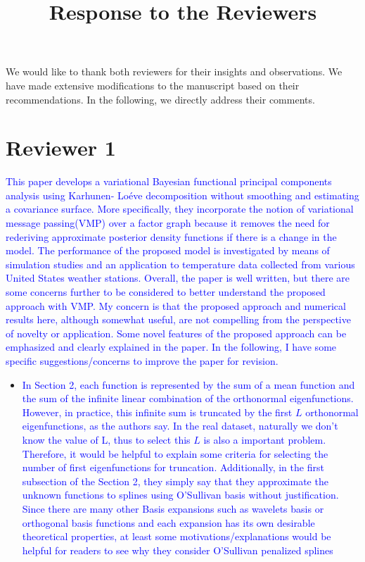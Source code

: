 \documentclass[12pt]{article}
\title{Response to the Reviewers}
\date{}
\author{}
\theoremstyle{plain}
\theoremstyle{definition}
\theoremstyle{remark}
\begin{document}
\maketitle

We would like to thank both reviewers for their insights and observations. We have made extensive modifications
to the manuscript based on their recommendations. In the following, we directly address their comments.


\section*{Reviewer 1}

\textcolor{blue}{
	This paper develops a variational Bayesian functional principal components analysis using
	Karhunen- Lo\'{e}ve decomposition without smoothing and estimating a covariance surface. More specifically,
	they incorporate the notion of variational message passing(VMP) over a factor graph because it removes the
	need for rederiving approximate posterior density functions if there is a change in the model. The performance
	of the proposed model is investigated by means of simulation studies and an application to temperature data
	collected from various United States weather stations. Overall, the paper is well written, but there are some
	concerns further to be considered to better understand the proposed approach with VMP. My concern is that
	the proposed approach and numerical results here, although somewhat useful, are not compelling from the
	perspective of novelty or application. Some novel features of the proposed approach can be emphasized and
	clearly explained in the paper. In the following, I have some specific suggestions/concerns to improve the paper for revision.
}

\vspace{1\baselineskip}


\begin{itemize}
	\item[\textcolor{blue}{\textbullet}] \textcolor{blue}{
		In Section 2, each function is represented by the sum of a mean function and the sum of the infinite
		linear combination of the orthonormal eigenfunctions. However, in practice, this infinite sum is truncated
		by the first $L$ orthonormal eigenfunctions, as the authors say. In the real dataset, naturally we don’t know
		the value of L, thus to select this $L$ is also a important problem. Therefore, it would be helpful to explain
		some criteria for selecting the number of first eigenfunctions for truncation. Additionally, in the first subsection
		of the Section 2, they simply say that they approximate the unknown functions to splines using O’Sullivan basis
		without justification. Since there are many other Basis expansions such as wavelets basis or orthogonal
		basis functions and each expansion has its own desirable theoretical properties, at least some
		motivations/explanations would be helpful for readers to see why they consider O’Sullivan penalized splines
	}
\end{itemize}
\end{document}
